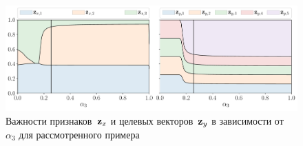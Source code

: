 \begin{figure}
	\centering
	\includegraphics[width=\linewidth]{figs/ch2/features_vs_alpha.pdf}
	\caption{Важности признаков~$\mathbf{z}_x$ и целевых векторов~$\mathbf{z}_y$ в зависимости от~$\alpha_3$ для рассмотренного примера}
	\label{fig:features_vs_alpha}
\end{figure}

